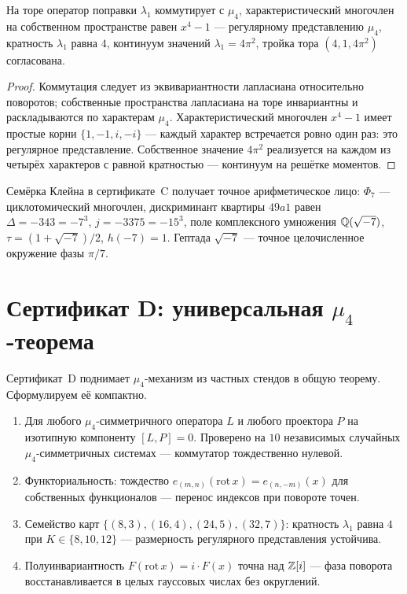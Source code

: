 \begin{theorem}\label{th:C2}
На торе оператор поправки $\lambda_1$ коммутирует с $\mu_4$,
характеристический многочлен на собственном пространстве равен
$x^4-1$ — регулярному представлению $\mu_4$, кратность $\lambda_1$
равна $4$, континуум значений $\lambda_1=4\pi^2$, тройка тора
$(4,1,4\pi^2)$ согласована.
\end{theorem}

\begin{proof}
Коммутация следует из эквивариантности лапласиана относительно
поворотов; собственные пространства лапласиана на торе инвариантны
и раскладываются по характерам $\mu_4$. Характеристический
многочлен $x^4-1$ имеет простые корни $\{1,-1,i,-i\}$ — каждый
характер встречается ровно один раз: это регулярное представление.
Собственное значение $4\pi^2$ реализуется на каждом из четырёх
характеров с равной кратностью — континуум на решётке моментов.
\end{proof}

Семёрка Клейна в сертификате~C получает точное арифметическое лицо:
$\Phi_7$ — циклотомический многочлен, дискриминант квартиры
$49a1$ равен $\Delta=-343=-7^3$, $j=-3375=-15^3$, поле комплексного
умножения $\mathbb{Q}(\sqrt{-7})$, $\tau=(1+\sqrt{-7})/2$, $h(-7)=1$.
Гептада $\sqrt{-7}$ — точное целочисленное окружение фазы $\pi/7$.

\section{Сертификат D: универсальная $\mu_4$-теорема}\label{sec:certD}

Сертификат~D поднимает $\mu_4$-механизм из частных стендов в общую
теорему. Сформулируем её компактно.

\begin{theorem}[D1--D4]\label{th:D}
\begin{enumerate}[leftmargin=2em, itemsep=0.15em]
\item[(D1)] Для любого $\mu_4$-симметричного оператора $L$ и любого
  проектора $P$ на изотипную компоненту $[L,P]=0$. Проверено на
  $10$ независимых случайных $\mu_4$-симметричных системах —
  коммутатор тождественно нулевой.
\item[(D2)] Функториальность: тождество
  $e_{(m,n)}(\mathrm{rot}\,x)=e_{(n,-m)}(x)$ для собственных
  функционалов — перенос индексов при повороте точен.
\item[(D3)] Семейство карт $\{(8,3),(16,4),(24,5),(32,7)\}$:
  кратность $\lambda_1$ равна $4$ при $K\in\{8,10,12\}$ —
  размерность регулярного представления устойчива.
\item[(D4)] Полуинвариантность $F(\mathrm{rot}\,x)=i\cdot F(x)$
  точна над $\mathbb{Z}[i]$ — фаза поворота восстанавливается в целых
  гауссовых числах без округлений.
\end{enumerate}
\end{theorem}

